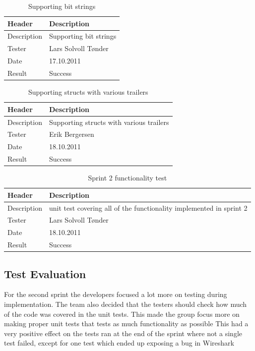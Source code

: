 \begin{table}[!htb] \footnotesize \center
\caption{ Supporting bit strings \label{tab:sp2TID12}}
\begin{tabular}{l l}
	\toprule
	Header & Description \\
	\midrule
	Description & Supporting bit strings \\
	Tester & Lars Solvoll Tønder \\
	Date & 17.10.2011 \\
	Result & Success\\
	\bottomrule
\end{tabular}
\end{table}

\begin{table}[!htb] \footnotesize \center
\caption{Supporting structs with various trailers \label{tab:sp2TID13}}
\begin{tabular}{l l}
	\toprule
	Header & Description \\
	\midrule
	Description & Supporting structs with various trailers \\
	Tester & Erik Bergersen \\
	Date & 18.10.2011 \\
	Result & Success\\
	\bottomrule
\end{tabular}
\end{table}

\begin{table}[!htb] \footnotesize \center
\caption{Sprint 2 functionality test\label{tab:sp2TID14}}
\begin{tabular}{l l}
	\toprule
	Header & Description \\
	\midrule
	Description & unit test covering all of the functionality implemented in sprint 2 \\
	Tester & Lars Solvoll Tønder \\
	Date & 18.10.2011 \\
	Result & Success\\
	\bottomrule
\end{tabular}
\end{table}

\subsection{Test Evaluation}
For the second sprint the developers focused a lot more on testing during implementation. The team also decided that the testers should check how much of the code was covered in the unit tests. This made the group focus more on making proper unit tests that tests as much functionality as possible This had a very positive effect on the tests ran at the end of the sprint where not a single test failed, except for one test which ended up exposing a bug in Wireshark

